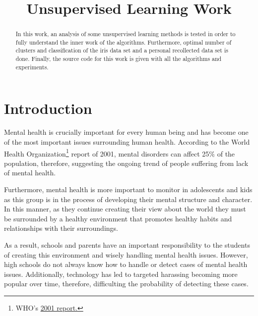 \documentclass[conference]{IEEEtran}
\theoremstyle{definition}
\theoremstyle{remark}
\theoremstyle{remark}
\begin{document}
\title{Unsupervised Learning Work}


\author{
  }

\maketitle

\begin{abstract}
  In this work, an analysis of some unsupervised learning methods is tested in
  order to fully understand the inner work of the algorithms. Furthermore,
  optimal number of clusters and classification of the iris data set and a
  personal recollected data set is done. Finally, the source code for this work
  is given with all the algorithms and experiments.
\end{abstract}



\section{Introduction}
Mental health is crucially important for every human being and has become one of
the most important issues surrounding human health. According to the World
Health Organization\footnote{WHO's \href{https://bit.ly/34l2v94}{2001 report.}}
report of 2001, mental disorders can affect 25\% of the population, therefore,
suggesting the ongoing trend of people suffering from lack of mental health.

Furthermore, mental health is more important to monitor in adolescents and kids
as this group is in the process of developing their mental structure and
character. In this manner, as they continue creating their view about the world
they must be surrounded by a healthy environment that promotes healthy habits
and relationships with their surroundings.

As a result, schools and parents have an important responsibility to the
students of creating this environment and wisely handling mental health issues.
However, high schools do not always know how to handle or detect cases of mental
health issues. Additionally, technology has led to targeted harassing becoming
more popular over time, therefore, difficulting the probability of detecting
these cases.
\end{document}

